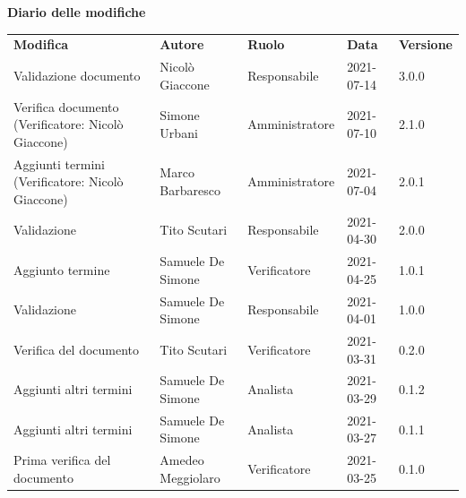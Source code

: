 \documentclass[a4paper]{article}
\begin{document}
\begin{center}
    \textbf{\Large Diario delle modifiche}\\
    \vspace{10px}
    \begin{table}[h!]
        \centering
        \renewcommand{\arraystretch}{1.8}
        \begin{tabular}{p{150px} p{90px} p{60px} p{60px} p{45px}}
            \rowcolor{logo!70} \textbf{Modifica}                        & \textbf{Autore}   & \textbf{Ruolo} & \textbf{Data} & \textbf{Versione} \\
            Validazione documento                                       & Nicolò Giaccone   & Responsabile   & 2021-07-14    & 3.0.0             \\
            Verifica documento \newline (Verificatore: Nicolò Giaccone) & Simone Urbani     & Amministratore & 2021-07-10    & 2.1.0             \\
            Aggiunti termini \newline (Verificatore: Nicolò Giaccone)   & Marco Barbaresco  & Amministratore & 2021-07-04    & 2.0.1             \\
            Validazione                                                 & Tito Scutari      & Responsabile   & 2021-04-30    & 2.0.0             \\
            Aggiunto termine                                            & Samuele De Simone & Verificatore   & 2021-04-25    & 1.0.1             \\
            Validazione                                                 & Samuele De Simone & Responsabile   & 2021-04-01    & 1.0.0             \\
            Verifica del documento                                      & Tito Scutari      & Verificatore   & 2021-03-31    & 0.2.0             \\
            Aggiunti altri termini                                      & Samuele De Simone & Analista       & 2021-03-29    & 0.1.2             \\
            Aggiunti altri termini                                      & Samuele De Simone & Analista       & 2021-03-27    & 0.1.1             \\
            Prima verifica del documento                                & Amedeo Meggiolaro & Verificatore   & 2021-03-25    & 0.1.0             \\

\end{tabular}
\end{table}
\end{center}
\end{document}
